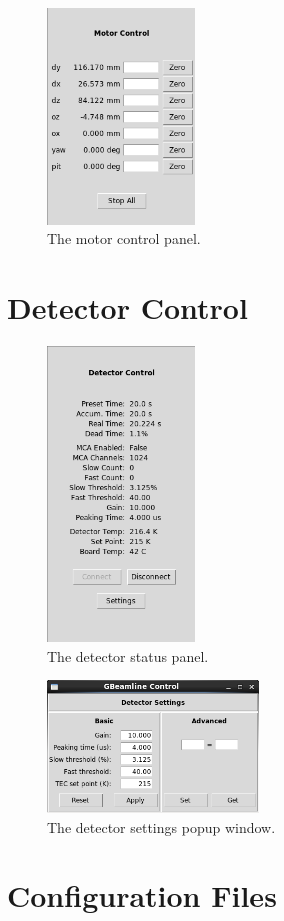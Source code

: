 \begin{figure}
\centering
\includegraphics[width=0.35\textwidth]{motorctl.png}
\caption{\label{fig:motorctl} The motor control panel.}
\end{figure}

\section{Detector Control}

\begin{figure}
\centering
\includegraphics[width=0.35\textwidth]{detctl.png}
\caption{\label{fig:detctl} The detector status panel.}
\end{figure}

\begin{figure}
\centering
\includegraphics[width=0.5\textwidth]{detsettings.png}
\caption{\label{fig:detsettings} The detector settings popup window.}
\end{figure}

\section{Configuration Files}
